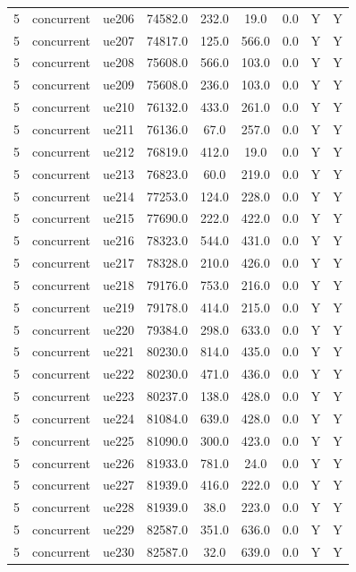 \begin{table}[ht]
\begin{tabular}{|c|c|c|c|c|c|c|c|c|}
5 & concurrent & ue206 & 74582.0 & 232.0 & 19.0 & 0.0 & Y & Y \\
5 & concurrent & ue207 & 74817.0 & 125.0 & 566.0 & 0.0 & Y & Y \\
5 & concurrent & ue208 & 75608.0 & 566.0 & 103.0 & 0.0 & Y & Y \\
5 & concurrent & ue209 & 75608.0 & 236.0 & 103.0 & 0.0 & Y & Y \\
5 & concurrent & ue210 & 76132.0 & 433.0 & 261.0 & 0.0 & Y & Y \\
5 & concurrent & ue211 & 76136.0 & 67.0 & 257.0 & 0.0 & Y & Y \\
5 & concurrent & ue212 & 76819.0 & 412.0 & 19.0 & 0.0 & Y & Y \\
5 & concurrent & ue213 & 76823.0 & 60.0 & 219.0 & 0.0 & Y & Y \\
5 & concurrent & ue214 & 77253.0 & 124.0 & 228.0 & 0.0 & Y & Y \\
5 & concurrent & ue215 & 77690.0 & 222.0 & 422.0 & 0.0 & Y & Y \\
5 & concurrent & ue216 & 78323.0 & 544.0 & 431.0 & 0.0 & Y & Y \\
5 & concurrent & ue217 & 78328.0 & 210.0 & 426.0 & 0.0 & Y & Y \\
5 & concurrent & ue218 & 79176.0 & 753.0 & 216.0 & 0.0 & Y & Y \\
5 & concurrent & ue219 & 79178.0 & 414.0 & 215.0 & 0.0 & Y & Y \\
5 & concurrent & ue220 & 79384.0 & 298.0 & 633.0 & 0.0 & Y & Y \\
5 & concurrent & ue221 & 80230.0 & 814.0 & 435.0 & 0.0 & Y & Y \\
5 & concurrent & ue222 & 80230.0 & 471.0 & 436.0 & 0.0 & Y & Y \\
5 & concurrent & ue223 & 80237.0 & 138.0 & 428.0 & 0.0 & Y & Y \\
5 & concurrent & ue224 & 81084.0 & 639.0 & 428.0 & 0.0 & Y & Y \\
5 & concurrent & ue225 & 81090.0 & 300.0 & 423.0 & 0.0 & Y & Y \\
5 & concurrent & ue226 & 81933.0 & 781.0 & 24.0 & 0.0 & Y & Y \\
5 & concurrent & ue227 & 81939.0 & 416.0 & 222.0 & 0.0 & Y & Y \\
5 & concurrent & ue228 & 81939.0 & 38.0 & 223.0 & 0.0 & Y & Y \\
5 & concurrent & ue229 & 82587.0 & 351.0 & 636.0 & 0.0 & Y & Y \\
5 & concurrent & ue230 & 82587.0 & 32.0 & 639.0 & 0.0 & Y & Y \\

\end{tabular}
\end{table}
